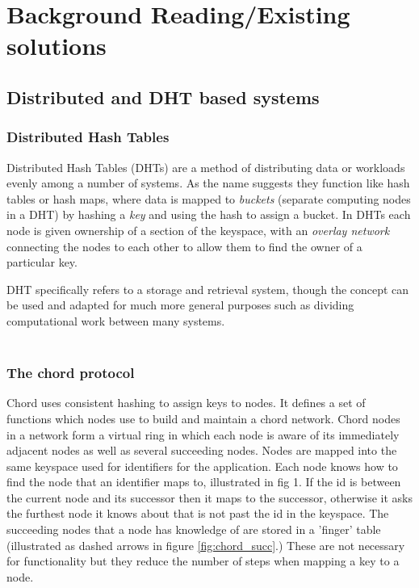 \documentclass{article}
\begin{document}
\section{Background Reading/Existing solutions}
\subsection{Distributed and DHT based systems}

\subsubsection{Distributed Hash Tables}
Distributed Hash Tables (DHTs) are a method of distributing data or workloads evenly among a number of systems. As the name suggests they function like hash tables or hash maps, where data is mapped to \textit{buckets} (separate computing nodes in a DHT) by hashing a \textit{key} and using the hash to assign a bucket. In DHTs each node is given ownership of a section of the keyspace, with an \textit{overlay network} connecting the nodes to each other to allow them to find the owner of a particular key.

DHT specifically refers to a storage and retrieval system, though the concept can be used and adapted for much more general purposes such as dividing computational work between many systems.
\\
\\
\subsubsection{The chord protocol} 
Chord \cite{chord} uses consistent hashing to assign keys to nodes. It defines a set of functions which nodes use to build and maintain a chord network. Chord nodes in a network form a virtual ring in which each node is aware of its immediately adjacent nodes as well as several succeeding nodes.
Nodes are mapped into the same keyspace used for identifiers for the application.
Each node knows how to find the node that an identifier maps to, illustrated in fig 1. If the id is between the current node and its successor then it maps to the successor, otherwise it asks the furthest node it knows about that is not past the id in the keyspace. The succeeding nodes that a node has knowledge of are stored in a 'finger' table (illustrated as dashed arrows in figure \ref{fig:chord_succ}.) These are not necessary for functionality but they reduce the number of steps when mapping a key to a node.
\end{document}

